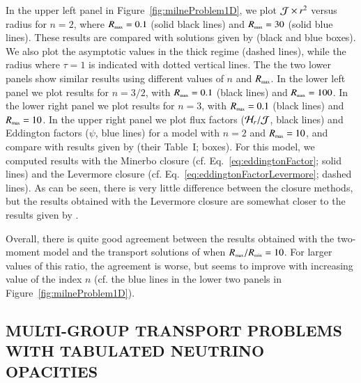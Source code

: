 \documentclass[11pt,letterpaper,twoside,english,final]{article}
\begin{document}
In the upper left panel in Figure~\ref{fig:milneProblem1D}, we plot $\mathcal{J}\times r^{2}$ versus radius for $n=2$, where $R_{\mbox{\tiny max}}=0.1$ (solid black lines) and $R_{\mbox{\tiny max}}=30$ (solid blue lines).  
These results are compared with solutions given by \citet{hummerRybicki_1971} (black and blue boxes).  
We also plot the asymptotic values in the thick regime (dashed lines), while the radius where $\tau=1$ is indicated with dotted vertical lines.  
The the two lower panels show similar results using different values of $n$ and $R_{\mbox{\tiny max}}$.  
In the lower left panel we plot results for $n=3/2$, with $R_{\mbox{\tiny max}}=0.1$ (black lines) and $R_{\mbox{\tiny max}}=100$.  
In the lower right panel we plot results for $n=3$, with $R_{\mbox{\tiny max}}=0.1$ (black lines) and $R_{\mbox{\tiny max}}=10$.  
In the upper right panel we plot flux factors ($\mathcal{H}_{r}/\mathcal{J}$, black lines) and Eddington factors ($\psi$, blue lines) for a model with $n=2$ and $R_{\mbox{\tiny max}}=10$, and compare with results given by \citet{hummerRybicki_1971} (their Table~I; boxes).  
For this model, we computed results with the Minerbo closure (cf. Eq.~\eqref{eq:eddingtonFactor}; solid lines) and the Levermore closure (cf. Eq.~\eqref{eq:eddingtonFactorLevermore}; dashed lines).  
As can be seen, there is very little difference between the closure methods, but the results obtained with the Levermore closure are somewhat closer to the results given by \citet{hummerRybicki_1971}.  

Overall, there is quite good agreement between the results obtained with the two-moment model and the transport solutions of \citet{hummerRybicki_1971} when $R_{\mbox{\tiny max}}/R_{\mbox{\tiny min}}=10$.  
For larger values of this ratio, the agreement is worse, but seems to improve with increasing value of the index $n$ (cf. the blue lines in the lower two panels in Figure~\ref{fig:milneProblem1D}).  

\begin{center}
  \section{MULTI-GROUP TRANSPORT PROBLEMS WITH TABULATED NEUTRINO OPACITIES}
  \label{sec:numericalTableOpacities}
\end{center}
\end{document}
